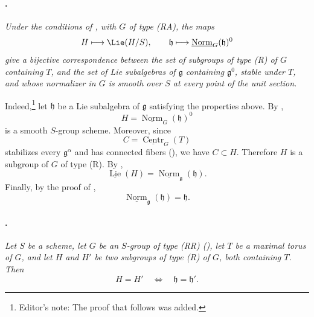\paragraph{.}
\textit{Under the conditions of , with \(G\) of type
\textup{(RA)}, the maps}
\[
  H\longmapsto\Lie(H/S),
  \qquad
  \mathfrak h\longmapsto
    \underline{\operatorname{Norm}}_G(\mathfrak h)^0
\]
\textit{give a bijective correspondence between the set of
subgroups of type \textup{(R)} of \(G\) containing \(T\), and the
set of Lie subalgebras of \(\mathfrak g\) containing
\(\mathfrak g^0\), stable under \(T\), and whose normalizer in
\(G\) is smooth over \(S\) at every point of the unit section.}

Indeed,\footnote{Editor's note: The proof that follows was added.}
let \(\mathfrak h\) be a Lie subalgebra of \(\mathfrak g\)
satisfying the properties above. By ,
\[
  H=\underline{\operatorname{Norm}}_G(\mathfrak h)^0
\]
is a smooth \(S\)-group scheme. Moreover, since
\[
  C=\underline{\operatorname{Centr}}_G(T)
\]
stabilizes every \(\mathfrak g^\alpha\) and has connected fibers
\textup{()}, we have \(C\subset H\). Therefore
\(H\) is a subgroup of \(G\) of type \textup{(R)}. By ,
\[
  \underline{\operatorname{Lie}}(H)
  =
  \underline{\operatorname{Norm}}_{\mathfrak g}(\mathfrak h).
\]
Finally, by the proof of ,
\[
  \underline{\operatorname{Norm}}_{\mathfrak g}(\mathfrak h)
  =
  \mathfrak h.
\]

\paragraph{.}
\textit{Let \(S\) be a scheme, let \(G\) be an \(S\)-group of type
\textup{(RR)} \textup{()}, let \(T\) be a maximal torus of
\(G\), and let \(H\) and \(H'\) be two subgroups of type
\textup{(R)} of \(G\), both containing \(T\). Then}
\[
  H=H'
  \quad\Longleftrightarrow\quad
  \mathfrak h=\mathfrak h'.
\]

